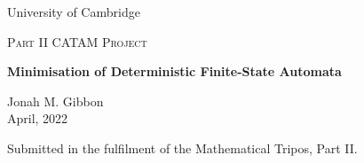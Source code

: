 \documentclass[10pt,a4paper,notitlepage]{article}
\begin{document}
\begin{titlepage}
	\centering
	\vspace*{5cm}
	{\large{University of Cambridge} \par}
	\vspace{1cm}
	{\Large \textsc{Part II CATAM Project}\par}
	\vspace{1.5cm}
	{\huge\bfseries Minimisation of Deterministic Finite-State Automata\par}
	\vspace{2cm}
	{\Large Jonah M. Gibbon\\ \vspace{0.6cm} April, 2022}
	\vfill
	


	{Submitted in the fulfilment of the Mathematical Tripos, Part II.}
\end{titlepage}
\end{document}
